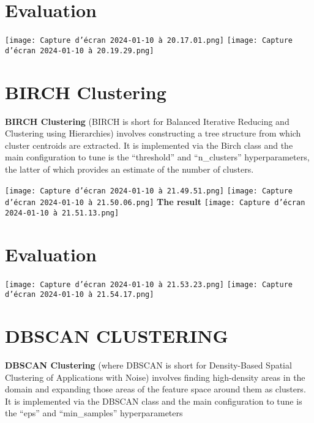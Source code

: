 \documentclass[12pt,a4paper]{report}
\begin{document}
\section{Evaluation}
\begin{center}
    \texttt{[image: Capture d’écran 2024-01-10 à 20.17.01.png]}
    \texttt{[image: Capture d’écran 2024-01-10 à 20.19.29.png]}
  
   
\end{center} 


\section{BIRCH Clustering }
\textbf{BIRCH Clustering} (BIRCH is short for Balanced Iterative Reducing and Clustering using Hierarchies) involves constructing a tree structure from which cluster centroids are extracted. It is implemented via the Birch class and the main configuration to tune is the “threshold” and “n\_clusters” hyperparameters, the latter of which provides an estimate of the number of clusters.\\

\begin{center}
    \texttt{[image: Capture d’écran 2024-01-10 à 21.49.51.png]}
     \texttt{[image: Capture d’écran 2024-01-10 à 21.50.06.png]}
   \textbf{The result}
   \texttt{[image: Capture d’écran 2024-01-10 à 21.51.13.png]}
\end{center} 

\section{Evaluation}
\begin{center}
    \texttt{[image: Capture d’écran 2024-01-10 à 21.53.23.png]}
    \texttt{[image: Capture d’écran 2024-01-10 à 21.54.17.png]}
  
   
\end{center} 

\section{DBSCAN CLUSTERING}
\textbf{DBSCAN Clustering} (where DBSCAN is short for Density-Based Spatial Clustering of Applications with Noise) involves finding high-density areas in the domain and expanding those areas of the feature space around them as clusters. It is implemented via the DBSCAN class and the main configuration to tune is the “eps” and “min\_samples” hyperparameters\\
\end{document}
